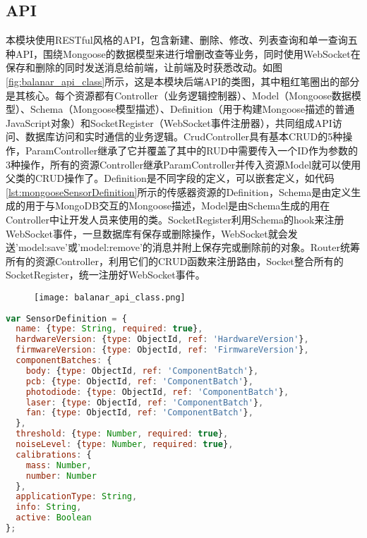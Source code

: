 \subsection{API}
本模块使用RESTful风格的API，包含新建、删除、修改、列表查询和单一查询五种API，围绕Mongoose的数据模型来进行增删改查等业务，同时使用WebSocket在保存和删除的同时发送消息给前端，让前端及时获悉改动。如图\ref{fig:balanar_api_class}所示，这是本模块后端API的类图，其中粗红笔圈出的部分是其核心。每个资源都有Controller（业务逻辑控制器）、Model（Mongoose数据模型）、Schema（Mongoose模型描述）、Definition（用于构建Mongoose描述的普通JavaScript对象）和SocketRegister（WebSocket事件注册器），共同组成API访问、数据库访问和实时通信的业务逻辑。CrudController具有基本CRUD的5种操作，ParamController继承了它并覆盖了其中的RUD中需要传入一个ID作为参数的3种操作，所有的资源Controller继承ParamController并传入资源Model就可以使用父类的CRUD操作了。Definition是不同字段的定义，可以嵌套定义，如代码\ref{lst:mongooseSensorDefinition}所示的传感器资源的Definition，Schema是由定义生成的用于与MongoDB交互的Mongoose描述，Model是由Schema生成的用在Controller中让开发人员来使用的类。SocketRegister利用Schema的hook来注册WebSocket事件，一旦数据库有保存或删除操作，WebSocket就会发送'model:save'或'model:remove'的消息并附上保存完或删除前的对象。Router统筹所有的资源Controller，利用它们的CRUD函数来注册路由，Socket整合所有的SocketRegister，统一注册好WebSocket事件。

\begin{figure}[!htp]
 \centering
 \texttt{[image: balanar\_api\_class.png]}
\end{figure}

\begin{lstlisting}[language={JavaScript}, label={lst:mongooseSensorDefinition}, caption={传感器的Mongoose数据模型}]
var SensorDefinition = {
  name: {type: String, required: true},
  hardwareVersion: {type: ObjectId, ref: 'HardwareVersion'},
  firmwareVersion: {type: ObjectId, ref: 'FirmwareVersion'},
  componentBatches: {
    body: {type: ObjectId, ref: 'ComponentBatch'},
    pcb: {type: ObjectId, ref: 'ComponentBatch'},
    photodiode: {type: ObjectId, ref: 'ComponentBatch'},
    laser: {type: ObjectId, ref: 'ComponentBatch'},
    fan: {type: ObjectId, ref: 'ComponentBatch'},
  },
  threshold: {type: Number, required: true},
  noiseLevel: {type: Number, required: true},
  calibrations: {
    mass: Number,
    number: Number
  },
  applicationType: String,
  info: String,
  active: Boolean
};
\end{lstlisting}
